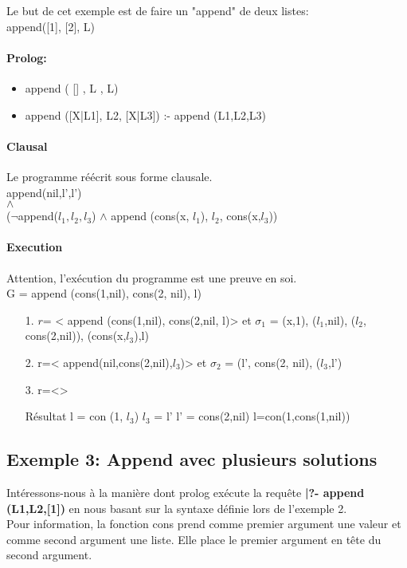 Le but de cet exemple est de faire un "append" de deux listes:\\
append([1], [2], L)

\paragraph{Prolog:}
\begin{itemize}
\item append ( [] , L , L)
\item append ([X|L1], L2, [X|L3]) :- append (L1,L2,L3)
\end{itemize}
\paragraph{Clausal}
Le programme réécrit sous forme clausale.\\
append(nil,l',l')\\
$\land$\\
($\neg$append($l_1,l_2,l_3$) $\land$ append (cons(x, $l_1$), $l_2$, cons(x,$l_3$))
\paragraph{Execution}
Attention, l'exécution du programme est une preuve en soi.\\
G = append (cons(1,nil), cons(2, nil), l)
\begin{itemize}
\item[1.] 
		$r$= < append (cons(1,nil), cons(2,nil, l)> et
		$\sigma_1$ = {(x,1), ($l_1$,nil), ($l_2$, cons(2,nil)), (cons(x,$l_3$),l)}
\item[2.]
		r=< append(nil,cons(2,nil),$l_3$)> et
		$\sigma_2$ = { (l', cons(2, nil), ($l_3$,l') }
		
\item[3.]
		r=<>
		
\item[Résultat]
l = con (1, $l_3$)
$l_3$ = l'
l' = cons(2,nil)
l=con(1,cons(1,nil))


\end{itemize}

\subsection{Exemple 3: Append avec plusieurs solutions}

Intéressons-nous à la manière dont prolog exécute la requête \textbf{|?- append (L1,L2,[1])} en nous basant sur la syntaxe définie lors de l'exemple 2.\\
Pour information, la fonction cons prend comme premier argument une valeur et comme second argument une liste. Elle place le premier argument en tête du second argument.\\

